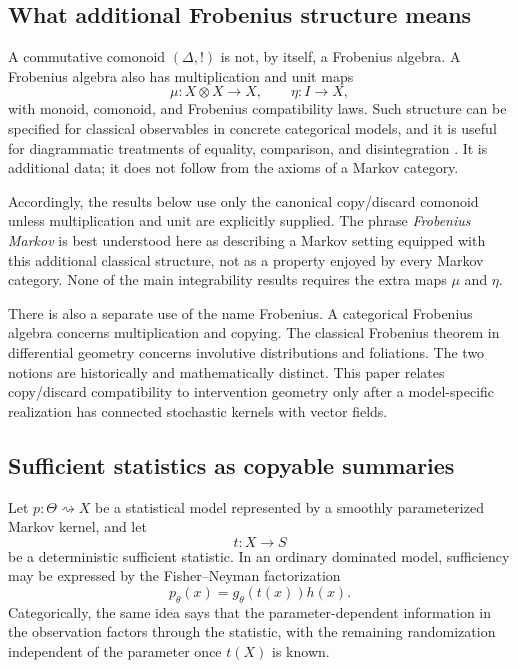 \documentclass{article}
\theoremstyle{plain}
\theoremstyle{definition}
\theoremstyle{remark}
\begin{document}
\subsection{What additional Frobenius structure means}

A commutative comonoid \((\Delta,! )\) is not, by itself, a Frobenius algebra.
A Frobenius algebra also has multiplication and unit maps
\[
  \mu:X\otimes X\longrightarrow X,
  \qquad
  \eta:I\longrightarrow X,
\]
with monoid, comonoid, and Frobenius compatibility laws.  Such structure can be
specified for classical observables in concrete categorical models, and it is
useful for diagrammatic treatments of equality, comparison, and
disintegration \citep{cho2017disintegration}.  It is additional data; it does
not follow from the axioms of a Markov category.

Accordingly, the results below use only the canonical copy/discard comonoid
unless multiplication and unit are explicitly supplied.  The phrase
\emph{Frobenius Markov} is best understood here as describing a Markov setting
equipped with this additional classical structure, not as a property enjoyed
by every Markov category.  None of the main integrability results requires the
extra maps \(\mu\) and \(\eta\).

There is also a separate use of the name Frobenius.  A categorical Frobenius
algebra concerns multiplication and copying.  The classical Frobenius theorem
in differential geometry concerns involutive distributions and foliations.
The two notions are historically and mathematically distinct.  This paper
relates copy/discard compatibility to intervention geometry only after a
model-specific realization has connected stochastic kernels with vector fields.

\subsection{Sufficient statistics as copyable summaries}

Let \(p:\Theta\rightsquigarrow X\) be a statistical model represented by a
smoothly parameterized Markov kernel, and let
\[
  t:X\longrightarrow S
\]
be a deterministic sufficient statistic.  In an ordinary dominated model,
sufficiency may be expressed by the Fisher--Neyman factorization
\[
  p_\theta(x)=g_\theta(t(x))h(x).
\]
Categorically, the same idea says that the parameter-dependent information in
the observation factors through the statistic, with the remaining
randomization independent of the parameter once \(t(X)\) is known.
\end{document}
